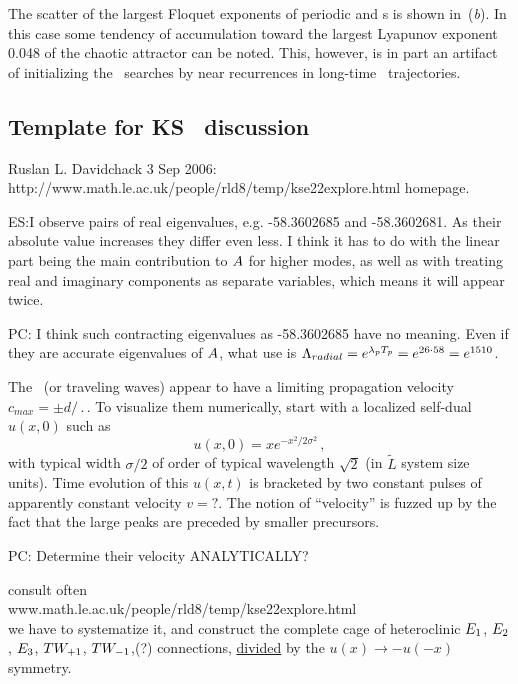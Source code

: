 The scatter of the largest Floquet exponents
of periodic and \rpo s is shown in \,(\textit{b}).
In this case some tendency of accumulation toward the largest
Lyapunov exponent 0.048 of the chaotic attractor
can be noted.  This, however, is in part an artifact of initializing
the \rpo\ searches by near recurrences in long-time \statesp\
trajectories.



\subsection{Template for KS \eqva\ discussion}

Ruslan L. Davidchack 3 Sep 2006:
http://www.math.le.ac.uk/people/rld8/temp/kse22explore.html homepage.


ES:{I observe pairs of real eigenvalues,
e.g. -58.3602685 and -58.3602681. As their absolute
value increases they differ even less.
I think it has to do with the linear part being the main
contribution to $A$ for higher modes, as well as
with treating real and imaginary components
as separate variables, which means it will appear twice.
        }

PC: {I think such contracting eigenvalues as -58.3602685 have no meaning.
Even if they are accurate eigenvalues of $A$,
what use is
$\Lambda_{radial} =  e^{\lambda_p {T_{p}}} = e^{26\cdot58} = e^{1510}$.
        }

The \reqva\ (or traveling waves) appear to have a limiting propagation
velocity $c_{max} = \pm d/\period{}$.
To visualize them numerically,
start with a localized self-dual $u(x,0)$ such as
\[
u(x,0) = x e^{- x^2/2\sigma^2}
\,,
\]
with typical width $\sigma/2$ of order of typical wavelength
$\sqrt{2}$ (in $\tilde{L}$ system size units).
Time evolution of this  $u(x,t)$ is bracketed by two constant
pulses of apparently constant velocity $v=?$.
The notion of ``velocity''
is fuzzed up by the fact that the large peaks are preceded
by smaller precursors.

PC: {Determine their velocity ANALYTICALLY?}

consult often
\\
        www.math.le.ac.uk/people/rld8/temp/kse22explore.html
\\
we have to systematize it, and
construct the complete cage of heteroclinic $E_{1}$, $E_{2}$, $E_{3}$,
$TW_{+1}$,
$TW_{-1}$,(?)
connections, \underline{divided} by the $u(x) \to - u(-x)$ symmetry.


